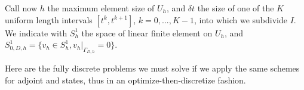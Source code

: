 \documentclass[english,a4paper,10pt,oneside]{scrbook}	%
\theoremstyle{break}
\theoremstyle{remark}
\begin{document}
%



Call now $h$ the maximum element size of $U_h$, and $\delta t$ the size of one of the $K$ uniform length intervals $[t^k,t^{k+1}]$, $k=0,...,K-1$, into which we subdivide $I$.
We indicate with $S^1_h$ the space of linear finite element on $U_h$, and  $S^1_{0,D,h}=\{ v_h \in S^1_h, {v_h}|_{\Gamma_{D,h}}=0\}$.

Here are the fully discrete problems we must solve if we apply the same schemes for adjoint and states, thus in an optimize-then-discretize fashion.
\end{document}
